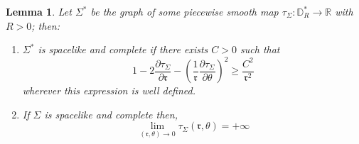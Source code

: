 \documentclass[a4paper,12pt]{article}
\def\r{\mathfrak{r}}
\def\RR{\mathbb{R}}
\newtheorem{lemou}{Lemma}[section]          %
\begin{document}
      
      \begin{lemou}\label{lem:surface_complete}Let $\Sigma^*$ be the graph of some piecewise smooth map $\tau_\Sigma: \mathbb D_R^*\rightarrow \RR$ with $R>0$; then:
      \begin{enumerate}


      \item $\Sigma^*$ is spacelike and complete  if there exists $C>0$ such that
	$$ 1-2\frac{\partial \tau_\Sigma}{\partial \r}-\left(\frac{1}{\r}\frac{\partial \tau_\Sigma}{\partial \theta}\right)^2\geq\frac{C^2}{\r^2}$$ 
	wherever this expression is well defined.
      \item  If $\Sigma$ is spacelike and complete then, 
		$$ \lim_{(\r,\theta) \rightarrow 0}\tau_\Sigma(\r,\theta) = +\infty$$
      \end{enumerate}
      \end{lemou}
\end{document}
